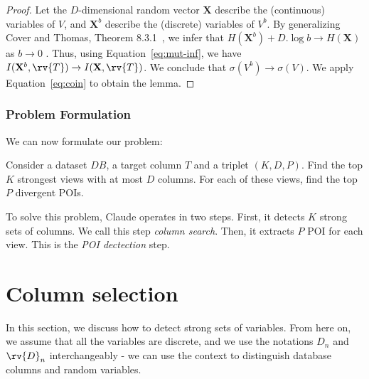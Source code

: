 \begin{proof}
    Let the $D$-dimensional random vector $\mathbf{X}$ describe the
    (continuous) variables of $V$, and $\mathbf{X}^b$ describe the (discrete)
    variables of $V^b$. By generalizing Cover and Thomas, Theorem
    8.3.1~\cite{cover2012elements}, we infer that $H(\mathbf{X}^b) + D.\log{b}
    \to H(\mathbf{X})$ as $b \to 0$ .  Thus, using Equation~\ref{eq:mut-inf},
    we have $I(\mathbf{X}^b, \rv{T}) \to I(\mathbf{X}, \rv{T})$. We conclude
    that $\sigma(V^b) \to \sigma(V)$. We apply Equation~\ref{eq:coin} to obtain
    the lemma.
\end{proof}

\subsubsection{Problem Formulation}

We can now formulate our problem:
\begin{problem}
Consider a dataset $DB$, a target column $T$ and a triplet $(K, D, P)$. Find
the top $K$ strongest views with at most $D$ columns. For each of these
views, find the top $P$ divergent POIs.
\end{problem}
To solve this problem, Claude operates in two steps. First, it detects $K$
strong sets of columns.  We call this step \emph{column search}.  Then, it
extracts $P$ POI for each view. This is the \emph{POI dectection} step.















\section{Column selection}
\label{sec:colum}

In this section, we discuss how to detect strong sets of variables. From
here on, we assume that all the variables are discrete, and we use the
notations $D_n$ and $\rv{D}_n$ interchangeably - we can use the context to
distinguish database columns and random variables.

